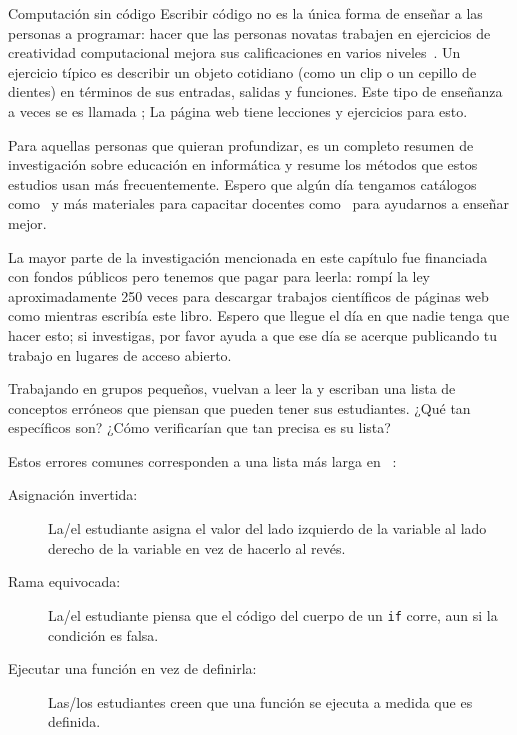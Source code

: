 \begin{aside}{Computación sin código}
  Escribir código no es la única forma de enseñar a las personas a programar:
  hacer que las personas novatas trabajen en ejercicios de creatividad computacional mejora sus calificaciones en varios niveles~\cite{Shel2017}.
  Un ejercicio típico es describir un objeto cotidiano (como un clip o un cepillo de dientes)
  en términos de sus entradas, salidas y funciones.
  Este tipo de enseñanza a veces se es llamada ;
  La página web  tiene lecciones y ejercicios para esto.
\end{aside}


Para aquellas personas que quieran profundizar,
\cite{Finc2019} es un completo resumen de investigación sobre educación en informática y
\cite{Ihan2016} resume los métodos que estos estudios usan más frecuentemente.
Espero que algún día tengamos catálogos como~\cite{Ojos2015}
y más materiales para capacitar docentes como~\cite{Hazz2014,Guzd2015a,Sent2018}
para ayudarnos a enseñar mejor.

La mayor parte de la investigación mencionada en este capítulo fue financiada con fondos públicos
pero tenemos que pagar para leerla:
rompí la ley aproximadamente 250 veces
para descargar trabajos científicos de páginas web como 
mientras escribía este libro.
Espero que llegue el día en que nadie tenga que hacer esto;
si investigas,
por favor ayuda a que ese día se acerque publicando tu trabajo en lugares de acceso abierto.



Trabajando en grupos pequeños,
vuelvan a leer la  y escriban una lista de conceptos erróneos que piensan que pueden tener sus estudiantes.
¿Qué tan específicos son?
¿Cómo verificarían que tan precisa es su lista?


Estos errores comunes corresponden a una lista más larga en ~\cite{Sirk2012}:

\begin{description}

\item[Asignación invertida:]
  La/el estudiante asigna el valor del lado izquierdo de la variable al lado derecho de la variable
  en vez de hacerlo al revés.

\item[Rama equivocada:]
  La/el estudiante piensa que el código del cuerpo de un \texttt{if} corre,
  aun si la condición es falsa.

\item[Ejecutar una función en vez de definirla:]
  Las/los estudiantes creen que una función se ejecuta a medida que es definida.

\end{description}

